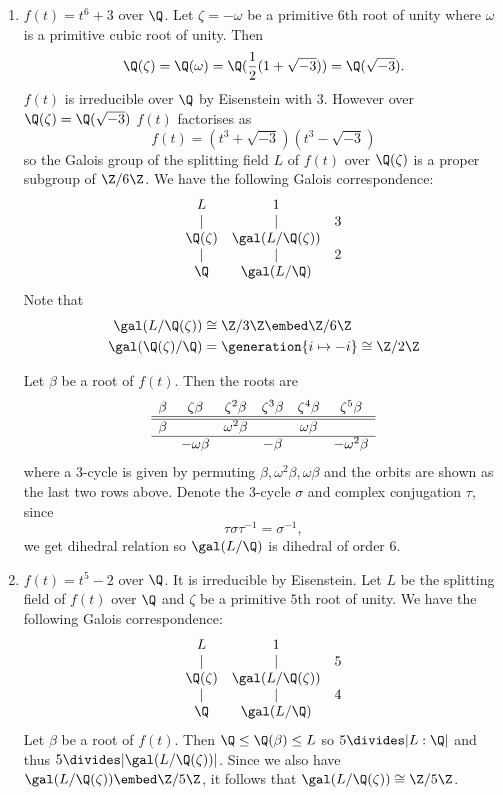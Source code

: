 \documentclass[a4paper]{article}
\begin{document}
\begin{eg}\leavevmode
  \begin{enumerate}
  \item \(f(t) = t^6 + 3\) over \(\Q\). Let \(\zeta = - \omega\) be a primitive \(6\)th root of unity where \(\omega\) is a primitive cubic root of unity. Then
  \[
    \Q(\zeta) = \Q(\omega) = \Q(\frac{1}{2}(1 + \sqrt{-3})) = \Q(\sqrt{-3}).
  \]
  \(f(t)\) is irreducible over \(\Q\) by Eisenstein with \(3\). However over \(\Q(\zeta) = \Q(\sqrt{-3})\) \(f(t)\) factorises as
  \[
    f(t) = (t^3 + \sqrt{-3}) (t^3 - \sqrt{-3})
  \]
  so the Galois group of the splitting field \(L\) of \(f(t)\) over \(\Q(\zeta)\) is a proper subgroup of \(\Z/6\Z\). We have the following Galois correspondence:
  \[
    \begin{array}[h]{ccc}
      L & 1 & \\
      | & | & 3 \\
      \Q(\zeta) & \gal(L/\Q(\zeta)) & \\
      | & | & 2 \\
      \Q & \gal(L/\Q) &
    \end{array}
  \]
   Note that
   \begin{align*}
     \gal(L/\Q(\zeta)) &\cong \Z/3\Z \embed \Z/6\Z \\
     \gal(\Q(\zeta)/\Q) &= \generation{i \mapsto -i} \cong \Z/2\Z
   \end{align*}

   Let \(\beta\) be a root of \(f(t)\). Then the roots are
   \[
     \begin{array}[h]{cccccc}
       \beta & \zeta \beta & \zeta^2 \beta & \zeta^3 \beta & \zeta^4 \beta & \zeta^5 \beta \\ \hline \hline
       \beta & & \omega^2 \beta & & \omega\beta & \\ \hline
       & - \omega \beta & & - \beta & & - \omega^2 \beta
     \end{array}
   \]
   where a \(3\)-cycle is given by permuting \(\beta, \omega^2 \beta, \omega \beta\) and the orbits are shown as the last two rows above. Denote the \(3\)-cycle \(\sigma\) and complex conjugation \(\tau\), since
   \[
     \tau \sigma \tau^{-1} = \sigma^{-1},
   \]
   we get dihedral relation so \(\gal(L/\Q)\) is dihedral of order \(6\).
 \item \(f(t) = t^5 - 2\) over \(\Q\). It is irreducible by Eisenstein. Let \(L\) be the splitting field of \(f(t)\) over \(\Q\) and \(\zeta\) be a primitive \(5\)th root of unity. We have the following Galois correspondence:
   \[
     \begin{array}[h]{ccc}
       L & 1 & \\
       | & | & 5 \\
       \Q(\zeta) & \gal(L/\Q(\zeta)) & \\
       | & | & 4 \\
       \Q & \gal(L/\Q)
     \end{array}
   \]
   Let \(\beta\) be a root of \(f(t)\). Then \(\Q \leq \Q(\beta) \leq L\) so \(5 \divides |L:\Q|\) and thus \(5 \divides |\gal(L/\Q(\zeta))|\). Since we also have \(\gal(L/\Q(\zeta)) \embed \Z/5\Z\), it follows that \(\gal(L/\Q(\zeta)) \cong \Z/5\Z\).


\end{enumerate}
\end{eg}
\end{document}
